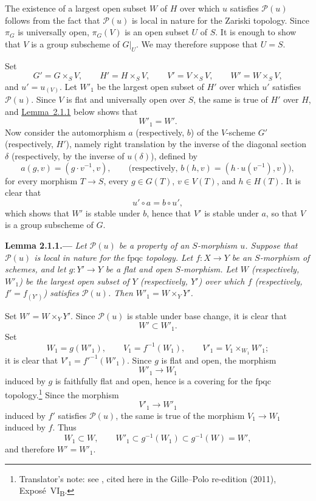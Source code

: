 The existence of a largest open subset \(W\) of \(H\) over which
\(u\) satisfies \(\mathscr P(u)\) follows from the fact that
\(\mathscr P(u)\) is local in nature for the Zariski topology.
Since \(\pi_G\) is universally open, \(\pi_G(V)\) is an open
subset \(U\) of \(S\). It is enough to show that \(V\) is a group
subscheme of \(G|_U\). We may therefore suppose that \(U=S\).

Set
\[
  G'=G\times_SV,\qquad
  H'=H\times_SV,\qquad
  V'=V\times_SV,\qquad
  W'=W\times_SV,
\]
and \(u'=u_{(V)}\). Let \(W'_1\) be the largest open subset of
\(H'\) over which \(u'\) satisfies \(\mathscr P(u)\). Since \(V\)
is flat and universally open over \(S\), the same is true of
\(H'\) over \(H\), and \hyperref[lem:sga3-VIB-2.1.1]{Lemma~2.1.1} below shows that
\[
  W'_1=W'.
\]
Now consider the automorphism \(a\) (respectively, \(b\)) of the
\(V\)-scheme \(G'\) (respectively, \(H'\)), namely right
translation by the inverse of the diagonal section \(\delta\)
(respectively, by the inverse of \(u(\delta)\)), defined by
\[
  a(g,v)=(g\cdot v^{-1},v),
  \qquad
  \bigl(\text{respectively, }b(h,v)
    =(h\cdot u(v^{-1}),v)\bigr),
\]
for every morphism \(T\to S\), every \(g\in G(T)\),
\(v\in V(T)\), and \(h\in H(T)\).
It is clear that
\[
  u'\circ a=b\circ u',
\]
which shows that \(W'\) is stable under \(b\), hence that \(V'\)
is stable under \(a\), so that \(V\) is a group subscheme of \(G\).

\medskip
{}\label{lem:sga3-VIB-2.1.1}%
\noindent\textbf{Lemma 2.1.1.---}
\emph{Let \(\mathscr P(u)\) be a property of an \(S\)-morphism
\(u\). Suppose that \(\mathscr P(u)\) is local in nature for the
\(\mathrm{fpqc}\) topology. Let \(f:X\to Y\) be an \(S\)-morphism of schemes,
and let \(g:Y'\to Y\) be a flat and open \(S\)-morphism. Let \(W\)
\textup(respectively, \(W'_1\)\textup) be the largest open subset of \(Y\)
\textup(respectively, \(Y'\)\textup) over which \(f\) \textup(respectively,
\(f'=f_{(Y')}\)\textup) satisfies \(\mathscr P(u)\). Then
\(W'_1=W\times_YY'\).}

Set \(W'=W\times_Y Y'\). Since \(\mathscr P(u)\) is stable under
base change, it is clear that
\[
  W'\subset W'_1.
\]
Set
\[
  W_1=g(W'_1),
  \qquad
  V_1=f^{-1}(W_1),
  \qquad
  V'_1=V_1\times_{W_1}W'_1;
\]
it is clear that \(V'_1=f'^{-1}(W'_1)\). Since \(g\) is flat and
open, the morphism
\[
  W'_1\longrightarrow W_1
\]
induced by \(g\) is faithfully flat and open, hence is a covering
for the \(\mathrm{fpqc}\) topology.\footnote{Translator's note: see
, cited here in the Gille--Polo
re-edition (2011), Expos\'e~VI\textsubscript{B}.} Since the morphism
\[
  V'_1\longrightarrow W'_1
\]
induced by \(f'\) satisfies \(\mathscr P(u)\), the same is true of
the morphism \(V_1\to W_1\) induced by \(f\). Thus
\[
  W_1\subset W,
  \qquad
  W'_1\subset g^{-1}(W_1)
    \subset g^{-1}(W)=W',
\]
and therefore \(W'=W'_1\).

